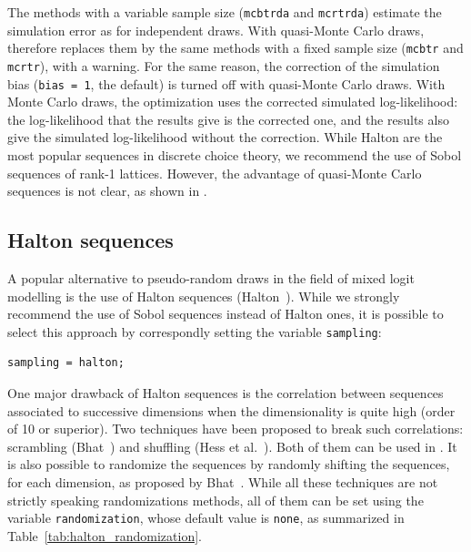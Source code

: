 The methods with a variable sample size (\verb|mcbtrda| and
\verb|mcrtrda|) estimate the simulation error as for independent
draws. With quasi-Monte Carlo draws, \amlet{} therefore replaces them by
the same methods with a fixed sample size (\verb|mcbtr| and
\verb|mcrtr|), with a warning.
For the same reason, the correction of the simulation bias
(\verb|bias = 1|, the default) is turned off with quasi-Monte Carlo
draws. With Monte Carlo draws, the optimization uses the corrected
simulated log-likelihood: the log-likelihood that the results give is
the corrected one, and the results also give the simulated
log-likelihood without the correction.
While Halton are the most popular sequences in discrete choice theory, we recommend the use of Sobol sequences of rank-1 lattices.
However, the advantage of quasi-Monte Carlo sequences is not clear, as shown in \cite{MungLEcuBastCiriTuff12}.

\subsection{Halton sequences}

A popular alternative to pseudo-random draws in the field of mixed
logit modelling is the use of Halton sequences
(Halton~\cite{Halt60}). While we strongly recommend the use of Sobol
sequences instead of Halton ones, it is possible to select this
approach by correspondly setting the variable \verb|sampling|:
\begin{verbatim}
sampling = halton;
\end{verbatim}
One major drawback of Halton sequences is the correlation between
sequences associated to successive dimensions when the dimensionality
is quite high (order of 10 or superior). Two techniques have been
proposed to break such correlations: scrambling (Bhat~\cite{Bhat03})
and shuffling (Hess et al.~\cite{HessPolaDaly03}). Both of them can be used in
\amlet{}. It is also possible to randomize the sequences by randomly
shifting the sequences, for each dimension, as proposed by
Bhat~\cite{Bhat03}. While all these techniques are not strictly
speaking randomizations methods, all of them can be set using the
variable \verb|randomization|, whose default value is \verb|none|, as
summarized in Table~\ref{tab:halton_randomization}.

